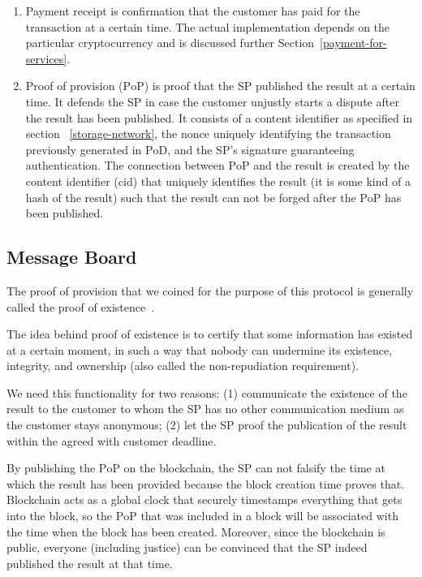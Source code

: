 \documentclass[pdftex,twocolumn,epjc3]{svjour3}
\begin{document}
{\begin{enumerate}
    \item Payment $\mathrm{receipt}$ is confirmation that the customer has paid for the transaction at a certain time. The actual implementation depends on the particular cryptocurrency and is discussed further Section~\ref{payment-for-services}.
    
    \item Proof of provision ($\mathrm{PoP}$) is proof that the SP published the result at a certain time. It defends the SP in case the customer unjustly starts a dispute after the result has been published. It consists of a content identifier as specified in section ~\ref{storage-network}, the $\mathrm{nonce}$ uniquely identifying the transaction previously generated in $\mathrm{PoD}$, and the SP's signature guaranteeing authentication. The connection between $\mathrm{PoP}$ and the result is created by the content identifier ($\mathrm{cid}$) that uniquely identifies the result (it is some kind of a hash of the result) such that the result can not be forged after the $\mathrm{PoP}$ has been published.
\end{enumerate}

\subsection{Message Board}\label{sec:message-board}
The proof of provision that we coined for the purpose of this protocol is generally called the proof of existence~\cite{crespoStamperyBlockchainTimestamping2017}.

The idea behind proof of existence is to certify that some information
has existed at a certain moment, in such a way that nobody can
undermine its existence, integrity, and ownership (also called the
non-repudiation requirement).


We need this functionality for two reasons: (1) communicate the existence of the result to the customer to whom the SP has no other communication medium as the customer stays anonymous; (2) let the SP proof the publication of the result within the agreed with customer deadline. 

By publishing the $\mathrm{PoP}$ on the blockchain, the SP can not falsify the time at which the result has been provided because the block creation time proves that. Blockchain acts as a global clock that securely timestamps everything that gets into the block, so the $\mathrm{PoP}$ that was included in a block will be associated with the time when the block has been created. Moreover, since the blockchain is public, everyone (including justice) can be convinced that the SP indeed published the result at that time.

}
\end{document}
